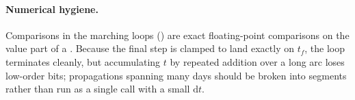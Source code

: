 \paragraph{Numerical hygiene.}
Comparisons in the marching loops () are exact floating-point
comparisons on the value part of a 
\citep{ieee754}. Because the final step is clamped to land exactly on $t_f$,
the loop terminates cleanly, but accumulating $t$ by repeated addition over a
long arc loses low-order bits; propagations spanning many days should be
broken into segments rather than run as a single call with a small
$\mathrm{d}t$.
